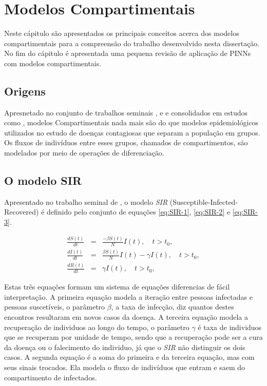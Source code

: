 
\chapter{Modelos Compartimentais}
\label{sec-modelos-compartimentais}

Neste cápitulo são apresentados os principais conceitos acerca dos modelos compartimentais
para a compreensão do trabalho desenvolvido nesta dissertação. No fim do cápitulo
é apresentada uma pequena revisão de aplicação de PINNs com modelos compartimentais.

\section{Origens}

Apresnetado no conjunto de trabalhos seminais \cite{kermack-mcKendrick:1927}, 
\cite{kermack-mcKendrick-pt2:1932} e \cite{kermack-mcKendrick-pt3:1933} e consolidados
em estudos como \cite{kendall:2023-modelos-epd-estocasticos}, 
modelos Compartimentais nada mais são do que modelos epidemiológicos utilizados 
no estudo de doenças contagiosas que separam a população em grupos.
Os fluxos de indivíduos entre esses grupos, chamados de compartimentos, são modelados 
por meio de operações de diferenciação.

\section{O modelo SIR}

Apresentado no trabalho seminal de \cite{kermack-mcKendrick:1927}, 
o modelo \textit{SIR} (Susceptible-Infected-Recovered) é definido pelo conjunto 
de equações \ref{eq:SIR-1}, \ref{eq:SIR-2} e \ref{eq:SIR-3}.

\begin{eqnarray}\label{eq:sir}
   \frac{dS(t)}{dt} &=& \frac{-\beta S(t)}{N} I(t),  \quad t > t_0, \label{eq:SIR-1}\\
   \frac{dI(t)}{dt} &=& \frac{\beta S(t)}{N} I(t) - \gamma I(t), \quad t > t_0, \label{eq:SIR-2}\\
   \frac{dR(t)}{dt} &=& \gamma I(t),  \quad t > t_0, \label{eq:SIR-3}
\end{eqnarray}

Estas três equações formam um sistema de equações diferencias de fácil interpretação.
A primeira equação modela a iteração entre pessoas infectadas e pessoas suscetíveis,
o parâmetro $\beta$, a taxa de infecção, diz quantos destes encontros resultaram 
em novos casos da doença. 
A terceira equação modela a recuperação de individuos ao
longo do tempo, o parâmetro $\gamma$ é taxa de individuos que se recuperam por 
unidade de tempo, sendo que a recuperação pode ser a cura da doença ou o falecimento
do individuo, já que o \textit{SIR} não distinguir os dois casos. 
A segunda equação é a soma do primeira e da terceira equação, mas com seus sinais
trocados. Ela modela o fluxo de indivíduos que entram e saem do compartimento
de infectados.  

